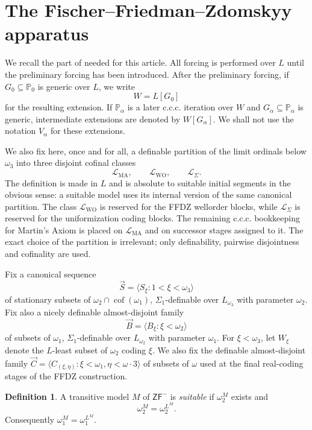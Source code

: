 \documentclass[11pt]{article}
\theoremstyle{plain}
\theoremstyle{definition}
\newtheorem{definition}[theorem]{Definition}
\theoremstyle{remark}
\newcommand{\Pp}{\mathbb P}
\newcommand{\ZF}{\mathsf{ZF}}
\newcommand{\cof}{\operatorname{cof}}
\newcommand{\Wground}{W}
\begin{document}
\section{The Fischer--Friedman--Zdomskyy apparatus}\label{sec:ffdz}

We recall the part of \cite{FISCHER2013763} needed for this article.  All forcing is
performed over $L$ until the preliminary forcing has been introduced.  After the
preliminary forcing, if $G_0\subseteq\Pp_0$ is generic over $L$, we write
\[
\Wground=L[G_0]
\]
for the resulting extension.  If $\Pp_\alpha$ is a later c.c.c. iteration over
$\Wground$ and $G_\alpha\subseteq\Pp_\alpha$ is generic, intermediate extensions
are denoted by $\Wground[G_\alpha]$.  We shall not use the notation $V_\alpha$ for
these extensions.

We also fix here, once and for all, a definable partition of the limit ordinals
below $\omega_3$ into three disjoint cofinal classes
\[
\mathcal L_{\mathrm{MA}},\qquad \mathcal L_{\mathrm{WO}},\qquad
\mathcal L_{\Sigma}.
\]
The definition is made in $L$ and is absolute to suitable initial segments in the
obvious sense: a suitable model uses its internal version of the same canonical
partition.  The class $\mathcal L_{\mathrm{WO}}$ is reserved for the FFDZ wellorder
blocks, while $\mathcal L_{\Sigma}$ is reserved for the uniformization coding
blocks.  The remaining c.c.c. bookkeeping for Martin's Axiom is placed on
$\mathcal L_{\mathrm{MA}}$ and on successor stages assigned to it.  The exact
choice of the partition is irrelevant; only definability, pairwise disjointness
and cofinality are used.

Fix a canonical sequence
\[
\vec S=\langle S_\xi:1<\xi<\omega_3\rangle
\]
of stationary subsets of $\omega_2\cap\cof(\omega_1)$, $\Sigma_1$-definable over
$L_{\omega_3}$ with parameter $\omega_2$.  Fix also a nicely definable
almost-disjoint family
\[
\vec B=\langle B_\xi:\xi<\omega_2\rangle
\]
of subsets of $\omega_1$, $\Sigma_1$-definable over $L_{\omega_2}$ with parameter
$\omega_1$.  For $\xi<\omega_3$, let $W_\xi$ denote the $L$-least subset of
$\omega_2$ coding $\xi$.  We also fix the definable almost-disjoint family
$\vec C=\langle C_{(\xi,\eta)}:\xi<\omega_1,\eta<\omega\cdot 3\rangle$ of subsets
of $\omega$ used at the final real-coding stages of the FFDZ construction.

\begin{definition}
A transitive model $M$ of $\ZF^-$ is \emph{suitable} if $\omega_2^M$ exists and
\[
\omega_2^M=\omega_2^{L^M}.
\]
Consequently $\omega_1^M=\omega_1^{L^M}$.
\end{definition}
\end{document}
